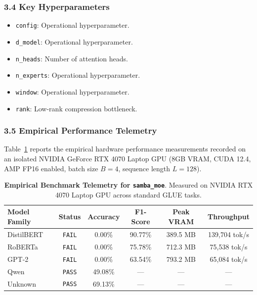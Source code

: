 \subsubsection*{3.4 Key Hyperparameters}
\begin{itemize}
    \item \texttt{config}: Operational hyperparameter.
    \item \texttt{d\_model}: Operational hyperparameter.
    \item \texttt{n\_heads}: Number of attention heads.
    \item \texttt{n\_experts}: Operational hyperparameter.
    \item \texttt{window}: Operational hyperparameter.
    \item \texttt{rank}: Low-rank compression bottleneck.
\end{itemize}

\subsubsection*{3.5 Empirical Performance Telemetry}
Table~\ref{tab:telemetry_samba_moe} reports the empirical hardware performance measurements recorded on an isolated NVIDIA GeForce RTX 4070 Laptop GPU (8GB VRAM, CUDA 12.4, AMP FP16 enabled, batch size $B=4$, sequence length $L=128$).

\begin{table}[h]
\centering
\small
\caption{\textbf{Empirical Benchmark Telemetry for \texttt{samba\_moe}}. Measured on NVIDIA RTX 4070 Laptop GPU across standard GLUE tasks.}
\label{tab:telemetry_samba_moe}
\begin{tabular*}{\columnwidth}{@{\extracolsep{\fill}}lccccc}
\toprule
\textbf{Model Family} & \textbf{Status} & \textbf{Accuracy} & \textbf{F1-Score} & \textbf{Peak VRAM} & \textbf{Throughput} \\
\midrule
DistilBERT & \texttt{FAIL} & 0.00\% & 90.77\% & 389.5 MB & 139,704 tok/s \\
RoBERTa & \texttt{FAIL} & 0.00\% & 75.78\% & 712.3 MB & 75,538 tok/s \\
GPT-2 & \texttt{FAIL} & 0.00\% & 63.54\% & 793.2 MB & 65,084 tok/s \\
Qwen & \texttt{PASS} & 49.08\% & --- & --- & --- \\
Unknown & \texttt{PASS} & 69.13\% & --- & --- & --- \\
\bottomrule
\end{tabular*}
\end{table}

